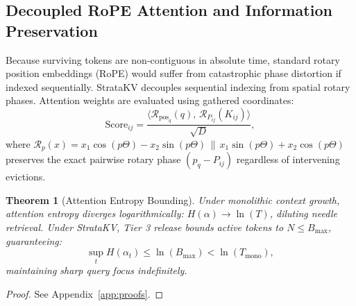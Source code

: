 \documentclass[11pt,letterpaper]{article}
\newtheorem{theorem}{Theorem}
\theoremstyle{definition}
\begin{document}
\subsection{Decoupled RoPE Attention and Information Preservation}
Because surviving tokens are non-contiguous in absolute time, standard rotary position embeddings (RoPE) \cite{su2024rope} would suffer from catastrophic phase distortion if indexed sequentially. StrataKV decouples sequential indexing from spatial rotary phases. Attention weights are evaluated using gathered coordinates:
\begin{equation}
    \text{Score}_{ij} = \frac{\langle \mathcal{R}_{\text{pos}_q}(q), \, \mathcal{R}_{P_{ij}}(K_{ij}) \rangle}{\sqrt{D}},
\end{equation}
where $\mathcal{R}_p(x) = x_1 \cos(p \Theta) - x_2 \sin(p \Theta) \,\|\, x_1 \sin(p \Theta) + x_2 \cos(p \Theta)$ preserves the exact pairwise rotary phase $(p_q - P_{ij})$ regardless of intervening evictions.

\begin{theorem}[Attention Entropy Bounding]
\label{thm:entropy}
Under monolithic context growth, attention entropy diverges logarithmically: $H(\alpha) \to \ln(T)$, diluting needle retrieval. Under StrataKV, Tier 3 release bounds active tokens to $N \le B_{\text{max}}$, guaranteeing:
\begin{equation}
    \sup_t H(\alpha_t) \le \ln(B_{\text{max}}) < \ln(T_{\text{mono}}),
\end{equation}
maintaining sharp query focus indefinitely.
\end{theorem}
\begin{proof}
See Appendix~\ref{app:proofs}.
\end{proof}
\end{document}
